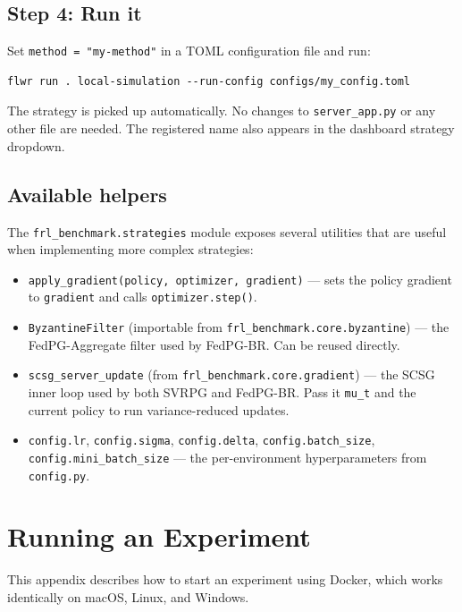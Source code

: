 \documentclass[a4paper, oneside]{discothesis}
\begin{document}
\section*{Step 4: Run it}

Set \texttt{method = "my-method"} in a TOML configuration file and run:

\begin{verbatim}
flwr run . local-simulation --run-config configs/my_config.toml
\end{verbatim}

The strategy is picked up automatically. No changes to \texttt{server\_app.py} or any other file are needed. The registered name also appears in the dashboard strategy dropdown.

\section*{Available helpers}

The \texttt{frl\_benchmark.strategies} module exposes several utilities that are useful when implementing more complex strategies:

\begin{itemize}
    \item \texttt{apply\_gradient(policy, optimizer, gradient)} --- sets the policy gradient to \texttt{gradient} and calls \texttt{optimizer.step()}.
    \item \texttt{ByzantineFilter} (importable from \texttt{frl\_benchmark.core.byzantine}) --- the FedPG-Aggregate filter used by FedPG-BR. Can be reused directly.
    \item \texttt{scsg\_server\_update} (from \texttt{frl\_benchmark.core.gradient}) --- the SCSG inner loop used by both SVRPG and FedPG-BR. Pass it \texttt{mu\_t} and the current policy to run variance-reduced updates.
    \item \texttt{config.lr}, \texttt{config.sigma}, \texttt{config.delta}, \texttt{config.batch\_size}, \texttt{config.mini\_batch\_size} --- the per-environment hyperparameters from \texttt{config.py}.
\end{itemize}

\chapter{Running an Experiment}
\label{app:running}

This appendix describes how to start an experiment using Docker, which works identically on macOS, Linux, and Windows.
\end{document}
